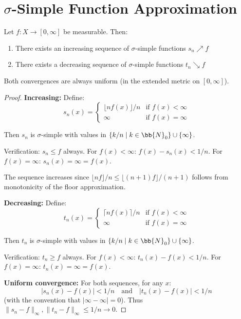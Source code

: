 \section{$\sigma$-Simple Function Approximation}

\begin{theorem}
Let $f: X \to [0, \infty]$ be measurable. Then:
\begin{enumerate}
    \item There exists an increasing sequence of $\sigma$-simple functions $s_n \nearrow f$
    \item There exists a decreasing sequence of $\sigma$-simple functions $t_n \searrow f$
\end{enumerate}
Both convergences are always uniform (in the extended metric on $[0, \infty]$).
\end{theorem}

\begin{proof}
\textbf{Increasing:} Define:
\[ s_n(x) = \begin{cases}
\lfloor n f(x) \rfloor / n & \text{if } f(x) < \infty \\
\infty & \text{if } f(x) = \infty
\end{cases} \]

Then $s_n$ is $\sigma$-simple with values in $\{k/n \mid k \in \bb{N}_0\} \cup \{\infty\}$.

Verification: $s_n \leq f$ always. For $f(x) < \infty$: $f(x) - s_n(x) < 1/n$. For $f(x) = \infty$: $s_n(x) = \infty = f(x)$.

The sequence increases since $\lfloor nf \rfloor / n \leq \lfloor (n+1)f \rfloor / (n+1)$ follows from monotonicity of the floor approximation.

\textbf{Decreasing:} Define:
\[ t_n(x) = \begin{cases}
\lceil n f(x) \rceil / n & \text{if } f(x) < \infty \\
\infty & \text{if } f(x) = \infty
\end{cases} \]

Then $t_n$ is $\sigma$-simple with values in $\{k/n \mid k \in \bb{N}_0\} \cup \{\infty\}$.

Verification: $t_n \geq f$ always. For $f(x) < \infty$: $t_n(x) - f(x) < 1/n$. For $f(x) = \infty$: $t_n(x) = \infty = f(x)$.

\textbf{Uniform convergence:} For both sequences, for any $x$:
\[ |s_n(x) - f(x)| < 1/n \quad \text{and} \quad |t_n(x) - f(x)| < 1/n \]
(with the convention that $|\infty - \infty| = 0$). Thus $\|s_n - f\|_\infty, \|t_n - f\|_\infty \leq 1/n \to 0$.
\end{proof}

